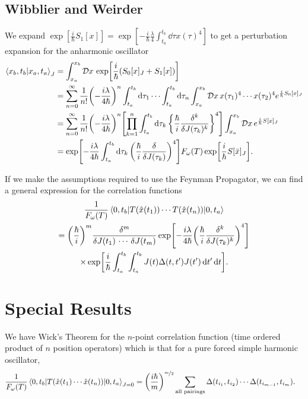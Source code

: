 \documentclass[]{revision-notes}
\begin{document}
\subsection{Wibblier and Weirder}
We expand \(\exp[\frac{i}{\hbar} S_1[x]] = \exp[-\frac{i}{\hbar} \frac{ \lambda }{4}\int_{t_a}^{t_b} \dd{\tau} x(\tau)^4]\) to get a perturbation expansion for the anharmonic oscillator
\begin{align*}
  \braket{x_b, t_b}{x_a, t_a}_J &= \int_{x_a}^{x_b} \DD{x} \exp[\frac{i}{\hbar}(S_0[x]_J + S_1[x])]\\
  &= \sum_{n=0}^{\infty} \frac{1}{n!} \qty(-\frac{i\lambda}{4\hbar})^n \int_{t_a}^{t_b} \dd{\tau_1} \cdots \int_{t_a}^{t_b} \dd{\tau_n}  \int_{x_a}^{x_b} \DD{x} x(\tau_1)^4 \cdots x(\tau_2)^4 e^{\frac{i}{\hbar} S_0[x]_J} \\
  &= \sum_{n=0}^{\infty} \frac{1}{n!} \qty(-\frac{i\lambda}{4\hbar})^n \qty[\prod_{k=1}^n \int_{t_a}^{t_b} \dd{\tau_k} \qty{\frac{\hbar}{i}\fdv[k]{J(\tau_k)}}^4] \int_{x_a}^{x_b} \DD{x}  e^{\frac{i}{\hbar} S[x]_J}\\
  &= \exp[-\frac{i\lambda}{4\hbar} \int_{t_a}^{t_b} \dd{\tau_k} \qty(\frac{\hbar}{i}\fdv{J(\tau_k)})^4] F_\omega(T) \exp[\frac{i}{\hbar} S[\bar{x}]_J].
\end{align*}

If we make the assumptions required to use the Feynman Propagator, we can find a general expression for the correlation functions
\begin{multline*}
  \frac{1}{F_\omega(T)} \mel{0, t_b}{T(\hat{x}(t_1)) \cdots T(\hat{x}(t_n))}{0, t_a} \\= \qty(\frac{\hbar}{i})^m \frac{\delta^m}{\delta J(t_1)\,\cdots\,\delta J(t_m)} \exp[-\frac{i\lambda}{4\hbar} \qty(\frac{\hbar}{i}\fdv[k]{J(\tau_k)})^4]\\\times \exp[\frac{i}{\hbar} \int_{t_a}^{t_b}\int_{t_a}^{t_b}J(t)\Delta(t, t^\prime)J(t^\prime)\dd{t^\prime}\dd{t}].
\end{multline*}

\section{Special Results}
We have Wick's Theorem for the \( n\)-point correlation function (time ordered product of \(n\) position operators) which is that for a pure forced simple harmonic oscillator,
\begin{align*}
  \frac{1}{F_\omega (T)} \mel{0, t_b}{T(\hat{x}(t_1) \cdots \hat{x}(t_n))}{0, t_a}_{J=0} &= \qty(\frac{i\hbar}{m})^{\nicefrac{m}{2}} \sum_{\text{all pairings}}\Delta(t_{i_1}, t_{i_2})\cdots \Delta(t_{i_{m-1}}, t_{i_m}).
\end{align*}
\end{document}
